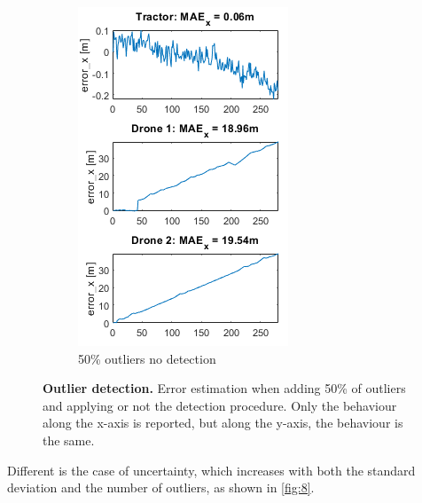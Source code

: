 \documentclass[letterpaper,twocolumn,10pt]{article}
\begin{document}
\begin{figure}[!h]
\begin{subfigure}[b]{0.23\textwidth}
         \includegraphics[width=\textwidth]{images/medium_noise_outlier_nodetection_touse.png}
         \caption{50\% outliers no detection}
         \label{fig:6b}
     \end{subfigure}
      \caption{\textbf{Outlier detection.} Error estimation when adding 50\% of outliers and applying or not the detection procedure. Only the behaviour along the x-axis is reported, but along the y-axis, the behaviour is the same. }
     \label{fig:6}
\end{figure}

Different is the case of uncertainty, which increases with both the standard deviation and the number of outliers, as shown in \autoref{fig:8}.
\end{document}
